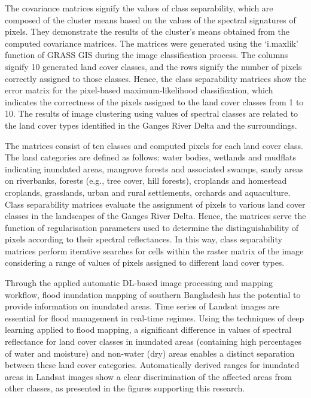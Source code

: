 \documentclass[water,article,accept,pdftex,oneauhor]{Definitions/mdpi}
\begin{document}
The covariance matrices signify the values of class separability, which are composed of the cluster means based on the values of the spectral signatures of pixels. They demonstrate the results of the cluster's means {obtained from the computed} covariance matrices{. The matrices} were generated {using} the `i.maxlik' function of GRASS GIS during the image classification process. The columns {signify} 10 generated land cover classes, and the rows signify the number of pixels correctly assigned to those classes. Hence, the class separability matrices show the error matrix for {the} pixel-based maximum-likelihood classification, which indicates the correctness of the pixels assigned to the {land cover }classes from 1 to 10. The results of {image} clustering{ }using values of spectral classes are related to {the} land cover types identified in the Ganges River Delta and {the} surroundings. 

The matrices consist of ten classes and computed pixels for each land cover class. The land categories are defined as follows: water bodies, wetlands and mudflats indicating inundated areas, mangrove forests and associated swamps, sandy areas on riverbanks, forests (e.g., tree cover, hill forests), croplands and homestead croplands, grasslands, urban and rural settlements, orchards and aquaculture. Class separability matrices evaluate the assignment of pixels to various land cover classes in the landscapes of the Ganges River Delta. Hence, the matrices serve the function of regularisation parameters used to determine the distinguishability of pixels according to their spectral reflectances. In this way, class separability matrices perform iterative searches for cells within the raster matrix of the image considering a range of values of pixels assigned to different land cover types.

Through the applied automatic DL-based image processing and mapping workflow, flood inundation mapping of southern Bangladesh {has} the potential to provide information on inundated areas{. Time series of Landsat images are essential }for flood management in real-time regimes. Using the techniques of deep learning applied to flood mapping, a significant difference in values of spectral reflectance for land cover classes in inundated areas (containing high percentages of water and moisture) and non-water (dry) areas enables a distinct separation between these land cover categories. Automatically derived ranges for inundated areas in Landsat images show a clear discrimination of {the} affected areas from other classes, as presented in {the }figures {supporting this research}. 
\end{document}
